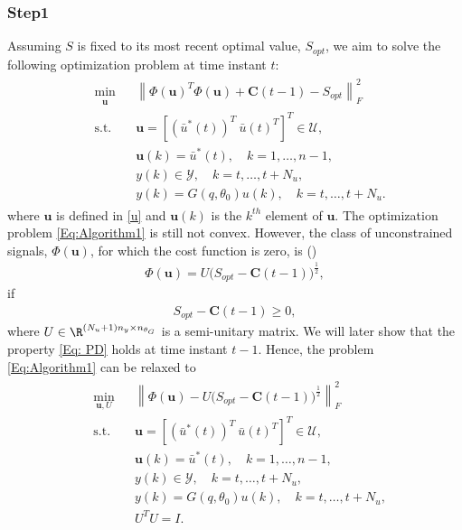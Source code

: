 \documentclass{ifacconf}
\begin{document}
\subsubsection{Step1} \label{Algorithm1}
Assuming $S$ is fixed to its most recent optimal value, $S_{opt}$, we aim to solve the following optimization problem at time instant $t$:
\vspace{-0.3cm}
\begin{eqnarray} \label{Eq:Algorithm1}
\begin{split}
&\min_{\substack {\textbf{u}}}
								&& \left \| \Phi(\textbf{u})^T\Phi(\textbf{u})+\textbf{C}(t-1) - S_{opt}  \right \|_F^2\\
&\text{s.t.}
			      		&& \textbf{u} =\left[(\bar{u}^*(t))^T \ \bar{u}(t)^T \right]^T \in \mathcal{U},\\&&& \textbf{u}(k) = \bar{u}^*(t), \quad k = 1, \ldots, n-1,\\
						&&& y(k) \in \mathcal{Y}, \quad k = t, \ldots, t+N_u,\\
						&&& y(k) = G(q,\theta_0){u}(k)  , \quad k = t, \ldots,t + N_u.
\end{split}
\end{eqnarray}
where $\textbf{u}$ is defined in \eqref{u} and $\textbf{u}(k)$ is the $k^{th}$ element of $\textbf{u}$.
The optimization problem \eqref{Eq:Algorithm1} is still not convex. However, the class of unconstrained signals, $\Phi(\textbf{u})$, for which the cost function is zero, is (\cite{stoica2007})
\begin{align} \label{Eq:HRS}
\Phi(\textbf{u}) = U \big( S_{opt} - \textbf{C}(t-1) \big)^{\frac{1}{2}},
\end{align}
if
\begin{align} \label{Eq: PD}
S_{opt} - \textbf{C}(t-1) \geq 0,
\end{align}
where $U \in \R^{(N_u+1)n_y \times n_{\theta_G}}$ is a semi-unitary matrix. We will later show that the property \eqref{Eq: PD} holds at time instant $t-1$. Hence, the problem \eqref{Eq:Algorithm1} can be relaxed to
\vspace{-0.3cm}
\begin{eqnarray} \label{Eq:OID_Step1_Reduced}
\begin{split}
&\min_{\textbf{u},U}
								&& \left \| \Phi(\textbf{u}) - U \big(S_{opt} - \textbf{C}(t-1) \big) ^{\frac{1}{2}}  \right \|_F^2\\
&\text{s.t.}
			      		&& \textbf{u} =\left[(\bar{u}^*(t))^T \ \bar{u}(t)^T \right]^T \in \mathcal{U},\\&&& \textbf{u}(k) = \bar{u}^*(t), \quad k = 1, \ldots, n-1,\\
						&&& y(k) \in \mathcal{Y}, \quad k = t, \ldots, t+N_u,\\
						&&& y(k) = G(q,\theta_0){u}(k)  , \quad k = t, \ldots,t + N_u,\\
						&&& U^T U = I.
\end{split}
\end{eqnarray}
\end{document}
